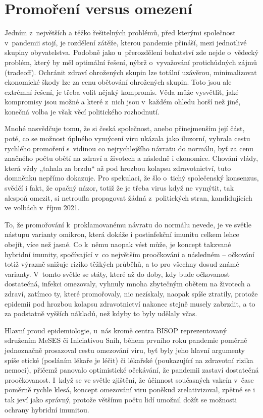 \section*{Promoření versus omezení}

Jedním z~největších a těžko řešitelných problémů, před kterými společnost v~pandemii stojí, je rozdělení zátěže, kterou pandemie přináší, mezi jednotlivé skupiny obyvatelstva. Podobně jako u~přerozdělení bohatství zde nejde o~vědecký problém, který by měl optimální řešení, nýbrž o~vyvažování protichůdných zájmů (tradeoff). Ochránit zdraví ohrožených skupin lze totální uzávěrou, minimalizovat ekonomické škody lze za cenu obětování ohrožených skupin. Toto jsou ale extrémní řešení, je třeba volit nějaký kompromis. Věda může vysvětlit, jaké kompromisy jsou možné a které z~nich jsou v~každém ohledu horší než jiné, konečná volba je však věcí politického rozhodnutí. 

Mnohé nasvědčuje tomu, že si česká společnost, anebo přinejmenším její část, poté, co se možnost úplného vymýcení viru ukázala jako iluzorní, vybrala cestu rychlého promoření s~vidinou co nejrychlejšího návratu do normálu, byť za cenu značného počtu obětí na zdraví a životech a následně i ekonomice. Chování vlády, která vždy „tahala za brzdu“ až pod hrozbou kolapsu zdravotnictví, tuto domněnku nepřímo dokazuje. Pro spekulaci, že šlo o~tichý společenský konsenzus, svědčí i fakt, že opačný názor, totiž že je třeba virus když ne vymýtit, tak alespoň omezit, si netroufla propagovat žádná z~politických stran, kandidujících ve volbách v~říjnu 2021. 

To, že promořování k~proklamovanému návratu do normálu nevede, je ve světle nástupu varianty omikron, která dokáže i postinfekční imunitu celkem lehce obejít, více než jasné. Co k~němu naopak vést může, je koncept takzvané hybridní imunity, spočívající v~co největším proočkování a následném  -- očkování totiž výrazně snižuje riziko těžkých průběhů, a to pro všechny dosud známé varianty. V~tomto světle se státy, které až do doby, kdy bude očkovanost dostatečná, infekci omezovaly, vyhnuly mnoha zbytečným obětem na životech a zdraví, zatímco ty, které promořovaly, nic nezískaly, naopak spíše ztratily,  protože epidemii pod hrozbou kolapsu zdravotnictví nakonec stejně musely zabrzdit, a to za podstatně vyšších nákladů, než kdyby to byly udělaly včas.

Hlavní proud epidemiologie, u~nás kromě centra BISOP reprezentovaný sdružením MeSES či Iniciativou Sníh, během prvního roku pandemie poměrně jednoznačně prosazoval cestu omezování viru, byť byly jeho hlavní argumenty spíše etické (posláním lékaře je léčit) či lékařské (poukazující na zdravotní rizika nemoci), přičemž panovalo optimistické očekávání, že pandemii zastaví dostatečná proočkovanost. I~když se ve světle zjištění, že účinnost současných vakcín v~čase poměrně rychle klesá, koncept omezování viru  poněkud zrelativizoval, zpětně se i tak jeví jako správný, protože většímu počtu lidí umožnil dožít se možnosti ochrany hybridní imunitou. 

